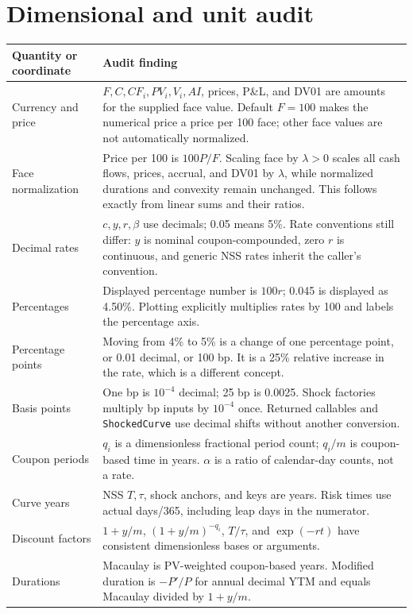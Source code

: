 \documentclass[12pt,a4paper]{article}
\begin{document}
\section{Dimensional and unit audit}
\small
\begin{longtable}{@{}p{}p{}@{}}
\toprule
Quantity or coordinate & Audit finding\\
\midrule
\endhead
Currency and price & $F,C,CF_i,PV_i,V_i,AI$, prices, P\&L, and DV01 are amounts for the supplied face value. Default $F=100$ makes the numerical price a price per 100 face; other face values are not automatically normalized.\\
Face normalization & Price per 100 is $100P/F$. Scaling face by $\lambda>0$ scales all cash flows, prices, accrual, and DV01 by $\lambda$, while normalized durations and convexity remain unchanged. This follows exactly from linear sums and their ratios.\\
Decimal rates & $c,y,r,\beta$ use decimals; 0.05 means 5\%. Rate conventions still differ: $y$ is nominal coupon-compounded, zero $r$ is continuous, and generic NSS rates inherit the caller's convention.\\
Percentages & Displayed percentage number is $100r$; 0.045 is displayed as 4.50\%. Plotting explicitly multiplies rates by 100 and labels the percentage axis.\\
Percentage points & Moving from 4\% to 5\% is a change of one percentage point, or 0.01 decimal, or 100 bp. It is a 25\% relative increase in the rate, which is a different concept.\\
Basis points & One bp is $10^{-4}$ decimal; 25 bp is 0.0025. Shock factories multiply bp inputs by $10^{-4}$ once. Returned callables and \texttt{ShockedCurve} use decimal shifts without another conversion.\\
Coupon periods & $q_i$ is a dimensionless fractional period count; $q_i/m$ is coupon-based time in years. $\alpha$ is a ratio of calendar-day counts, not a rate.\\
Curve years & NSS $T,\tau$, shock anchors, and keys are years. Risk times use actual days/365, including leap days in the numerator.\\
Discount factors & $1+y/m$, $(1+y/m)^{-q_i}$, $T/\tau$, and $\exp(-rt)$ have consistent dimensionless bases or arguments.\\
Durations & Macaulay is PV-weighted coupon-based years. Modified duration is $-P'/P$ for annual decimal YTM and equals Macaulay divided by $1+y/m$.\\

\end{longtable}
\end{document}
